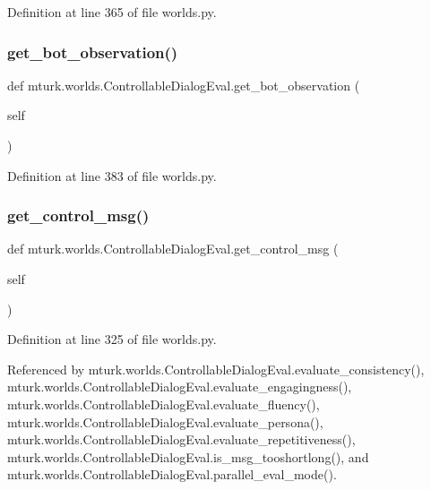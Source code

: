Definition at line 365 of file worlds.\+py.

\mbox{\label{classmturk_1_1worlds_1_1ControllableDialogEval_aa2b9073d3f127d25c510c8d8a362f869}} 
\subsubsection{\texorpdfstring{get\+\_\+bot\+\_\+observation()}{get\_bot\_observation()}}
{\footnotesize\ttfamily def mturk.\+worlds.\+Controllable\+Dialog\+Eval.\+get\+\_\+bot\+\_\+observation (\begin{DoxyParamCaption}\item[{}]{self }\end{DoxyParamCaption})}



Definition at line 383 of file worlds.\+py.

\mbox{\label{classmturk_1_1worlds_1_1ControllableDialogEval_ae626e15abbeee2b200a4b53dd43c961d}} 
\subsubsection{\texorpdfstring{get\+\_\+control\+\_\+msg()}{get\_control\_msg()}}
{\footnotesize\ttfamily def mturk.\+worlds.\+Controllable\+Dialog\+Eval.\+get\+\_\+control\+\_\+msg (\begin{DoxyParamCaption}\item[{}]{self }\end{DoxyParamCaption})}



Definition at line 325 of file worlds.\+py.



Referenced by mturk.\+worlds.\+Controllable\+Dialog\+Eval.\+evaluate\+\_\+consistency(), mturk.\+worlds.\+Controllable\+Dialog\+Eval.\+evaluate\+\_\+engagingness(), mturk.\+worlds.\+Controllable\+Dialog\+Eval.\+evaluate\+\_\+fluency(), mturk.\+worlds.\+Controllable\+Dialog\+Eval.\+evaluate\+\_\+persona(), mturk.\+worlds.\+Controllable\+Dialog\+Eval.\+evaluate\+\_\+repetitiveness(), mturk.\+worlds.\+Controllable\+Dialog\+Eval.\+is\+\_\+msg\+\_\+tooshortlong(), and mturk.\+worlds.\+Controllable\+Dialog\+Eval.\+parallel\+\_\+eval\+\_\+mode().

